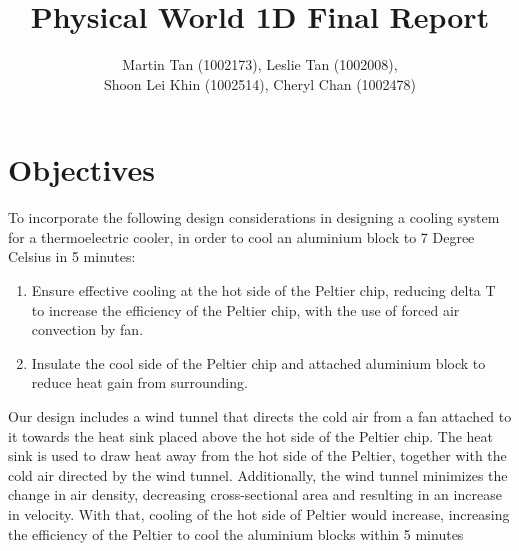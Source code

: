\documentclass[12pt,a4paper]{IEEEtran}
\author{Martin Tan (1002173), Leslie Tan (1002008), \\ Shoon Lei Khin (1002514), Cheryl Chan (1002478)}
\title{Physical World 1D Final Report}
\begin{document}
	\maketitle
	
	\section{Objectives}
	To incorporate the following design considerations in designing a cooling system for a thermoelectric cooler, in order to cool an aluminium block to 7 Degree Celsius in 5 minutes: \linebreak
	\begin{enumerate}
		\item Ensure effective cooling at the hot side of the Peltier chip, reducing delta T to increase the efficiency of the Peltier chip, with the use of forced air convection by fan.
		\item Insulate the cool side of the Peltier chip and attached aluminium block to reduce heat gain from surrounding.
	\end{enumerate}
	Our design includes a wind tunnel that directs the cold air from a fan attached to it towards the heat sink placed above the hot side of the Peltier chip. The heat sink is used to draw heat away from the hot side of the Peltier, together with the cold air directed by the wind tunnel. Additionally, the wind tunnel minimizes the change in air density, decreasing cross-sectional area and resulting in an increase in velocity. With that, cooling of the hot side of Peltier would increase, increasing the efficiency of the Peltier to cool the aluminium blocks within 5 minutes
\end{document}
